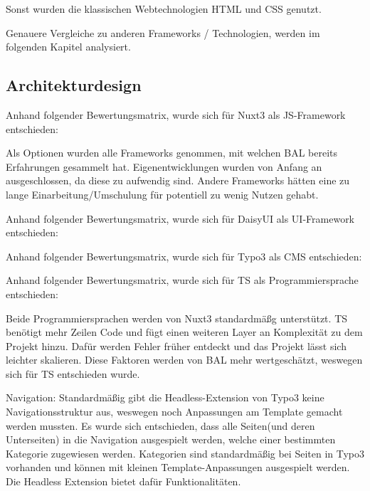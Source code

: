 Sonst wurden die klassischen Webtechnologien HTML und CSS genutzt.

Genauere Vergleiche zu anderen Frameworks / Technologien, werden im folgenden Kapitel analysiert.

\pagebreak

\subsection{Architekturdesign}
\label{sec:Architekturdesign}

Anhand folgender Bewertungsmatrix, wurde sich für Nuxt3 als JS-Framework entschieden:


Als Optionen wurden alle Frameworks genommen, mit welchen \acs{BAL} bereits Erfahrungen gesammelt hat. Eigenentwicklungen wurden von Anfang an ausgeschlossen, da diese zu aufwendig sind. Andere Frameworks hätten eine zu lange Einarbeitung/Umschulung für potentiell zu wenig Nutzen gehabt.

Anhand folgender Bewertungsmatrix, wurde sich für DaisyUI als UI-Framework entschieden:


Anhand folgender Bewertungsmatrix, wurde sich für Typo3 als CMS entschieden:


\pagebreak

Anhand folgender Bewertungsmatrix, wurde sich für TS als Programmiersprache entschieden:


Beide Programmiersprachen werden von Nuxt3 standardmäßg unterstützt. \acs{TS} benötigt mehr Zeilen Code und fügt einen weiteren Layer an Komplexität zu dem Projekt hinzu. Dafür werden Fehler früher entdeckt und das Projekt lässt sich leichter skalieren. Diese Faktoren werden von \acs{BAL} mehr wertgeschätzt, weswegen sich für \acs{TS} entschieden wurde.

Navigation: Standardmäßig gibt die Headless-Extension von Typo3 keine Navigationsstruktur aus, weswegen noch Anpassungen am Template gemacht werden mussten. Es wurde sich entschieden, dass alle Seiten(und deren Unterseiten) in die Navigation ausgespielt werden, welche einer bestimmten Kategorie zugewiesen werden. Kategorien sind standardmäßig bei Seiten in Typo3 vorhanden und können mit kleinen Template-Anpassungen ausgespielt werden. Die Headless Extension bietet dafür Funktionalitäten.

